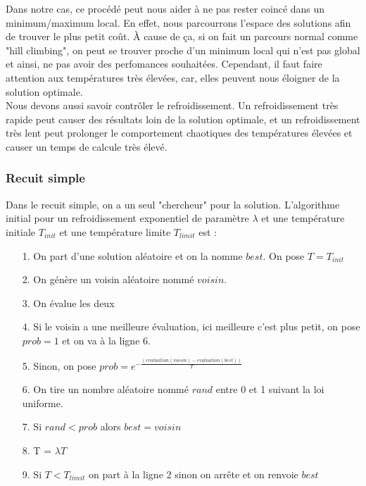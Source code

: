 \documentclass[11pt,french]{report}
\begin{document}
	Dans notre cas, ce procédé peut nous aider à ne pas rester coincé dans un minimum/maximum local. En effet, nous parcourrons l'espace des solutions afin de trouver le plus petit coût. À cause de ça, si on fait un parcours normal comme "hill climbing", on peut se trouver proche d'un minimum local qui n'est pas global et ainsi, ne pas avoir des perfomances souhaitées. Cependant, il faut faire attention aux températures très élevées, car, elles peuvent nous éloigner de la solution optimale.\\
	
	Nous devons aussi savoir contrôler le refroidissement. Un refroidissement très rapide peut causer des résultats loin de la solution optimale, et un refroidissement très lent peut prolonger le comportement chaotiques des températures élevées et causer un temps de calcule très élevé.
	
	\subsubsection{Recuit simple\label{recuit simple}}
	Dans le recuit simple, on a un seul "chercheur" pour la solution. 
	L'algorithme initial pour un refroidissement exponentiel de paramètre $\lambda$ et une température initiale $T_{init}$ et une température limite $T_{limit}$ est :\\
	
	\begin{itemize}
		\item[1.] On part d'une solution aléatoire et on la nomme $best$. On pose $T = T_{init}$
		\item[2.] On génère un voisin aléatoire nommé $voisin$.
		\item[3.] On évalue les deux
		\item[4.] Si le voisin a une meilleure évaluation, ici meilleure c'est plus petit, on pose $prob = 1$ et on va à la ligne 6.
		\item[5.] Sinon, on pose $prob = e^{-\frac{(evaluation(voisin) - evaluation(best))}{T}}$
		\item[6.] On tire un nombre aléatoire nommé $rand$ entre 0 et 1 suivant la loi uniforme.
		\item[7.] Si $rand < prob$ alors $best = voisin$
		\item[8.] T = $\lambda T$
		\item[9.] Si $T<T_{limit}$ on part à la ligne 2 sinon on arrête et on renvoie $best$\\
	\end{itemize}
\end{document}
